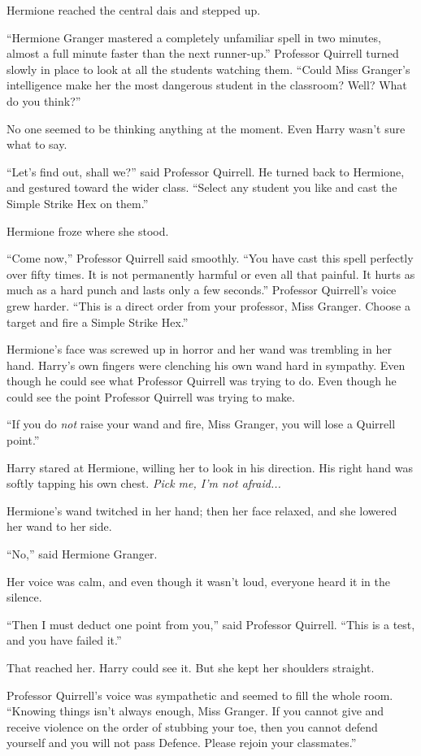 Hermione reached the central dais and stepped up.

``Hermione Granger mastered a completely unfamiliar spell in two minutes, almost a full minute faster than the next runner-up.'' Professor Quirrell turned slowly in place to look at all the students watching them. ``Could Miss Granger's intelligence make her the most dangerous student in the classroom? Well? What do you think?''

No one seemed to be thinking anything at the moment. Even Harry wasn't sure what to say.

``Let's find out, shall we?'' said Professor Quirrell. He turned back to Hermione, and gestured toward the wider class. ``Select any student you like and cast the Simple Strike Hex on them.''

Hermione froze where she stood.

``Come now,'' Professor Quirrell said smoothly. ``You have cast this spell perfectly over fifty times. It is not permanently harmful or even all that painful. It hurts as much as a hard punch and lasts only a few seconds.'' Professor Quirrell's voice grew harder. ``This is a direct order from your professor, Miss Granger. Choose a target and fire a Simple Strike Hex.''

Hermione's face was screwed up in horror and her wand was trembling in her hand. Harry's own fingers were clenching his own wand hard in sympathy. Even though he could see what Professor Quirrell was trying to do. Even though he could see the point Professor Quirrell was trying to make.

``If you do \emph{not} raise your wand and fire, Miss Granger, you will lose a Quirrell point.''

Harry stared at Hermione, willing her to look in his direction. His right hand was softly tapping his own chest. \emph{Pick me, I'm not afraid...}

Hermione's wand twitched in her hand; then her face relaxed, and she lowered her wand to her side.

``No,'' said Hermione Granger.

Her voice was calm, and even though it wasn't loud, everyone heard it in the silence.

``Then I must deduct one point from you,'' said Professor Quirrell. ``This is a test, and you have failed it.''

That reached her. Harry could see it. But she kept her shoulders straight.

Professor Quirrell's voice was sympathetic and seemed to fill the whole room. ``Knowing things isn't always enough, Miss Granger. If you cannot give and receive violence on the order of stubbing your toe, then you cannot defend yourself and you will not pass Defence. Please rejoin your classmates.''


